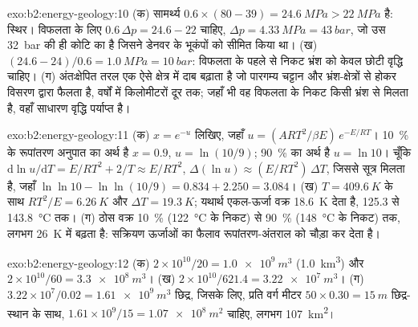 \begin{solution}{exo:b2:energy-geology:10}
(क) सामर्थ्य $0.6 \times (80 - 39) = \qty{24.6}{MPa} > \qty{22}{MPa}$ है: स्थिर। विफलता के लिए
$0.6\,\Delta p = 24.6 - 22$ चाहिए, $\Delta p = \qty{4.33}{MPa} = \qty{43}{bar}$, जो उस
\qty{32}{bar} की ही कोटि का है जिसने डेनवर के भूकंपों को सीमित किया था। (ख) $(24.6 - 24)/0.6 = \qty{1.0}{MPa} =
\qty{10}{bar}$: विफलता के पहले से निकट भ्रंश को केवल छोटी वृद्धि चाहिए। (ग) अंतःक्षेपित तरल एक ऐसे क्षेत्र में
दाब बढ़ाता है जो पारगम्य चट्टान और भ्रंश-क्षेत्रों से होकर विसरण द्वारा फैलता है, वर्षों में किलोमीटरों दूर तक;
जहाँ भी वह विफलता के निकट किसी भ्रंश से मिलता है, वहाँ साधारण वृद्धि पर्याप्त है।
\end{solution}

\begin{solution}{exo:b2:energy-geology:11}
(क) $x = e^{-u}$ लिखिए, जहाँ $u = (ART^2/\beta E)\,e^{-E/RT}$। \qty{10}{\percent} के रूपांतरण अनुपात का
अर्थ है $x = 0.9$, $u = \ln(10/9)$; \qty{90}{\percent} का अर्थ है $u = \ln 10$। चूँकि
$\mathrm{d}\ln u/\mathrm{d}T = E/RT^2 + 2/T \approx E/RT^2$, $\Delta(\ln u) \approx (E/RT^2)\,\Delta T$,
जिससे सूत्र मिलता है, जहाँ $\ln\ln 10 - \ln\ln(10/9) = 0.834 + 2.250 = 3.084$। (ख) $T =
\qty{409.6}{K}$ के साथ $RT^2/E = \qty{6.26}{K}$ और $\Delta T = \qty{19.3}{K}$; यथार्थ एकल-ऊर्जा
वक्र \qty{18.6}{K} देता है, 125.3 से \qty{143.8}{\celsius} तक। (ग) ठोस वक्र \qty{10}{\percent} (\qty{122}{\celsius} के निकट)
से \qty{90}{\percent} (\qty{148}{\celsius} के निकट) तक, लगभग
\qty{26}{K} में बढ़ता है: सक्रियण ऊर्जाओं का फैलाव रूपांतरण-अंतराल को चौड़ा कर देता है।
\end{solution}

\begin{solution}{exo:b2:energy-geology:12}
(क) $2 \times 10^{10}/20 = \qty{1.0e9}{m^3}$ (\qty{1.0}{km^3}) और $2 \times 10^{10}/60 =
\qty{3.3e8}{m^3}$। (ख) $2 \times 10^{10}/621.4 = \qty{3.22e7}{m^3}$। (ग) $3.22 \times 10^7/0.02 =
\qty{1.61e9}{m^3}$ छिद्र, जिसके लिए, प्रति वर्ग मीटर $50 \times 0.30 = \qty{15}{m}$ छिद्र-स्थान के साथ,
$1.61 \times 10^9/15 = \qty{1.07e8}{m^2}$ चाहिए, लगभग \qty{107}{km^2}।
\end{solution}

